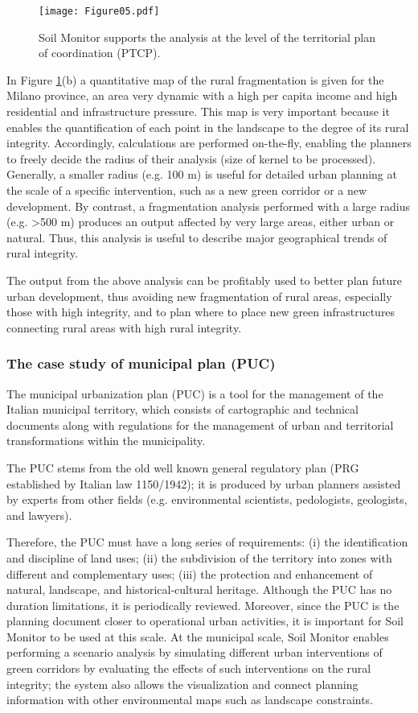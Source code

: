 \documentclass[APA,LATO1COL,doublespace]{WileyNJD-v2}
\begin{document}
\begin{figure}[t] %
    \centerline{\texttt{[image: Figure05.pdf]}}
    \caption{ Soil Monitor supports the analysis at the level of the territorial plan of coordination (PTCP). } \label{fig:casePROV}
\end{figure}

In Figure \ref{fig:casePROV}(b) a quantitative map of the rural fragmentation is given for the Milano province, an area very dynamic with a high per capita income and high residential and infrastructure pressure. 
This map is very important because it enables the quantification of each point in the landscape to the degree of its rural integrity. 
Accordingly, calculations are performed on-the-fly, enabling the planners to freely decide the radius of their analysis (size of kernel to be processed).
Generally, a smaller radius (e.g. 100 m) is useful for detailed urban planning at the scale of a specific intervention, such as a new green corridor or a new development.
By contrast, a fragmentation analysis performed with a large radius (e.g. >500 m) produces an output affected by very large areas, either urban or natural. 
Thus, this analysis is useful to describe major geographical trends of rural integrity.

The output from the above analysis can be profitably used to better plan future urban development, thus avoiding new fragmentation of rural areas, especially those with high integrity, and to plan where to place new green infrastructures connecting rural areas with high rural integrity.

\subsubsection{The case study of municipal plan (PUC)}
The municipal urbanization plan (PUC) is a tool for the management of the Italian municipal territory, which consists of cartographic and technical documents along with regulations for the management of urban and territorial transformations within the municipality.

The PUC stems from the old well known general regulatory plan (PRG established by Italian law 1150/1942); it is produced by urban planners assisted by experts from other fields (e.g. environmental scientists, pedologists, geologists, and lawyers).

Therefore, the PUC must have a long series of requirements: (i) the identification and discipline of land uses; (ii) the subdivision of the territory into zones with different and complementary uses; (iii) the protection and enhancement of natural, landscape, and historical-cultural heritage. 
Although the PUC has no duration limitations, it is periodically reviewed.
Moreover, since the PUC is the planning document closer to operational urban activities, it is important for Soil Monitor to be used at this scale. 
At the municipal scale, Soil Monitor enables performing a scenario analysis by simulating different urban interventions of green corridors by evaluating the effects of such interventions on the rural integrity; the system also allows the visualization and connect planning information with other environmental maps such as landscape constraints.
\end{document}

